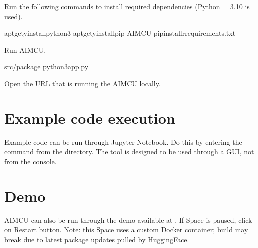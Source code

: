 \documentclass[letterpaper,10pt,oneside,english]{sphinxmanual}
\begin{document}
\sphinxAtStartPar
Run the following commands to install required dependencies (Python = 3.10 is used).

\begin{sphinxVerbatim}[commandchars=\\\{\}]
apt\PYGZhy{}get\PYGZhy{}yinstallpython3
apt\PYGZhy{}get\PYGZhy{}yinstallpip
AIM\PYGZhy{}CU
pipinstall\PYGZhy{}rrequirements.txt
\end{sphinxVerbatim}

\sphinxAtStartPar
Run AIM\sphinxhyphen{}CU.

\begin{sphinxVerbatim}[commandchars=\\\{\}]
src/package
python3app.py
\end{sphinxVerbatim}

\sphinxAtStartPar
Open the URL  that is running the AIM\sphinxhyphen{}CU locally.


\chapter{Example code execution}
\label{\detokenize{index:example-code-execution}}
\sphinxAtStartPar
Example code can be run through Jupyter Notebook. Do this by entering the  command from the  directory. The tool is designed to be used through a GUI, not from the console.


\chapter{Demo}
\label{\detokenize{index:demo}}
\sphinxAtStartPar
AIM\sphinxhyphen{}CU can also be run through the demo available at . If Space is paused, click on Restart button. Note: this Space uses a custom Docker container; build may break due to latest package updates pulled by HuggingFace.
\end{document}
